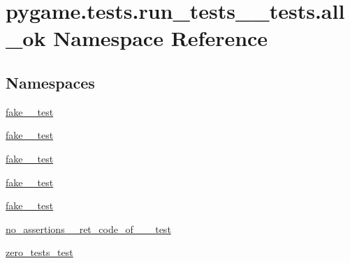 \hypertarget{namespacepygame_1_1tests_1_1run__tests____tests_1_1all__ok}{}\section{pygame.\+tests.\+run\+\_\+tests\+\_\+\+\_\+tests.\+all\+\_\+ok Namespace Reference}
\label{namespacepygame_1_1tests_1_1run__tests____tests_1_1all__ok}
\subsection*{Namespaces}
\begin{DoxyCompactItemize}
\item 
 \hyperlink{namespacepygame_1_1tests_1_1run__tests____tests_1_1all__ok_1_1fake__2__test}{fake\+\_\+\_\+test}
\item 
 \hyperlink{namespacepygame_1_1tests_1_1run__tests____tests_1_1all__ok_1_1fake__3__test}{fake\+\_\+\_\+test}
\item 
 \hyperlink{namespacepygame_1_1tests_1_1run__tests____tests_1_1all__ok_1_1fake__4__test}{fake\+\_\+\_\+test}
\item 
 \hyperlink{namespacepygame_1_1tests_1_1run__tests____tests_1_1all__ok_1_1fake__5__test}{fake\+\_\+\_\+test}
\item 
 \hyperlink{namespacepygame_1_1tests_1_1run__tests____tests_1_1all__ok_1_1fake__6__test}{fake\+\_\+\_\+test}
\item 
 \hyperlink{namespacepygame_1_1tests_1_1run__tests____tests_1_1all__ok_1_1no__assertions____ret__code__of__1____test}{no\+\_\+assertions\+\_\+\+\_\+ret\+\_\+code\+\_\+of\+\_\+\_\+\+\_\+test}
\item 
 \hyperlink{namespacepygame_1_1tests_1_1run__tests____tests_1_1all__ok_1_1zero__tests__test}{zero\+\_\+tests\+\_\+test}
\end{DoxyCompactItemize}
